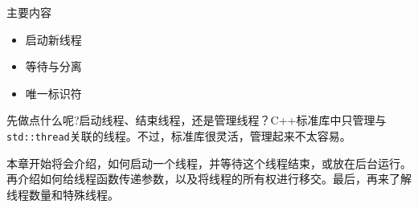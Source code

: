 主要内容

\begin{itemize}
    \item 启动新线程
    \item 等待与分离
    \item 唯一标识符
\end{itemize}

先做点什么呢?启动线程、结束线程，还是管理线程？C++标准库中只管理与\texttt{std::thread}关联的线程。不过，标准库很灵活，管理起来不太容易。

本章开始将会介绍，如何启动一个线程，并等待这个线程结束，或放在后台运行。再介绍如何给线程函数传递参数，以及将线程的所有权进行移交。最后，再来了解线程数量和特殊线程。